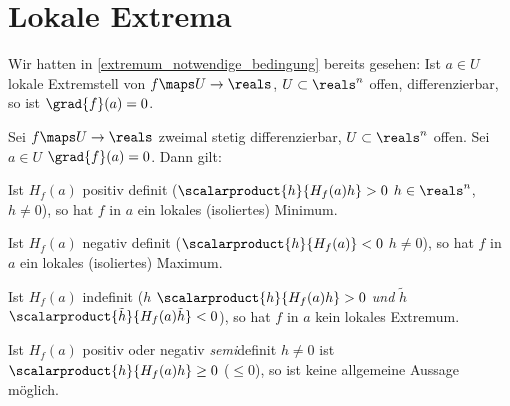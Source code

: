 \section{Lokale Extrema}
Wir hatten in \ref{extremum_notwendige_bedingung} bereits gesehen: Ist \( a\in U \) lokale Extremstell von \( f\maps U\to \reals \), \( U\subset \reals^n \) offen, differenzierbar, so ist \( \grad{f}(a)=0 \).
\begin{satz}\label{hinreichende_bedingung_isoliertes_extremum}
  Sei \( f\maps U\to \reals \) zweimal stetig differenzierbar, \( U\subset \reals^n \) offen. Sei \( a\in U \) \sd \( \grad{f}(a)=0 \). Dann gilt:
  \begin{eigenschaftenenumerate}
    \item\label{hinreichende_bedingung_isoliertes_minimum} Ist \( H_f(a) \) positiv definit (\dh \( \scalarproduct{h}{H_f(a)h}>0 \) \tforall \( h\in \reals^n \), \( h\neq 0 \)), so hat \( f \) in \( a \) ein lokales (isoliertes) Minimum.
    \item\label{hinreichende_bedingung_isoliertes_maximum} Ist \( H_f(a) \) negativ definit (\dh \( \scalarproduct{h}{H_f(a)}<0 \) \tforall \( h\neq 0 \)), so hat \( f \) in \( a \) ein lokales (isoliertes) Maximum.
    \item\label{hinreichende_bedingung_kein_extremum} Ist \( H_f(a) \) indefinit (\dh \texists  \( h \) \sd \( \scalarproduct{h}{H_f(a)h}>0 \) \emph{und} \texists \( \tilde{h} \) \sd \( \scalarproduct{\tilde{h}}{H_f(a)\tilde{h}}<0 \)), so hat \( f \) in \( a \) kein lokales Extremum.
  \end{eigenschaftenenumerate}
\end{satz}
\begin{bemerkung*}
  Ist \( H_f(a) \) positiv oder negativ \emph{semi}definit \sd \tforall \( h\neq 0 \) ist \( \scalarproduct{h}{H_f(a)h}\geq 0 \) (\bzw \( \leq 0 \)), so ist keine allgemeine Aussage möglich.
\end{bemerkung*}
